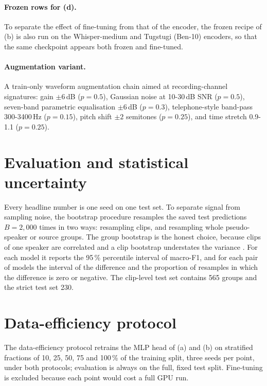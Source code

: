 \paragraph{Frozen rows for (d).} To separate the effect of fine-tuning from
that of the encoder, the frozen recipe of (b) is also run on the Whisper-medium
and Tugstugi (Ben-10) encoders, so that the same checkpoint appears both frozen
and fine-tuned.

\paragraph{Augmentation variant.} A train-only waveform augmentation chain
aimed at recording-channel signatures: gain $\pm 6$\,dB ($p=0.5$), Gaussian
noise at 10-30\,dB SNR ($p=0.5$), seven-band parametric equalisation
$\pm 6$\,dB ($p=0.3$), telephone-style band-pass 300-3400\,Hz ($p=0.15$),
pitch shift $\pm 2$ semitones ($p=0.25$), and time stretch 0.9-1.1
($p=0.25$).

\section{Evaluation and statistical uncertainty}
\label{sec:method-eval}

Every headline number is one seed on one test set. To separate signal from
sampling noise, the bootstrap procedure resamples the saved test predictions
$B = 2{,}000$ times in two ways: resampling clips, and resampling whole
pseudo-speaker or source groups. The group bootstrap is the honest choice,
because clips of one speaker are correlated and a clip bootstrap understates
the variance \cite{Efron1993Introduction}. For each model it reports the 95\,\%
percentile interval of macro-F1, and for each pair of models the interval of
the difference and the proportion of resamples in which the difference is zero
or negative. The clip-level test set contains 565 groups and the strict test
set 230.

\section{Data-efficiency protocol}
\label{sec:method-efficiency}

The data-efficiency protocol retrains the MLP head of (a) and (b) on
stratified fractions of 10, 25, 50, 75 and 100\,\% of the training split,
three seeds per point, under both protocols; evaluation is always on the full,
fixed test split. Fine-tuning is excluded because each point would cost a full
GPU run.

